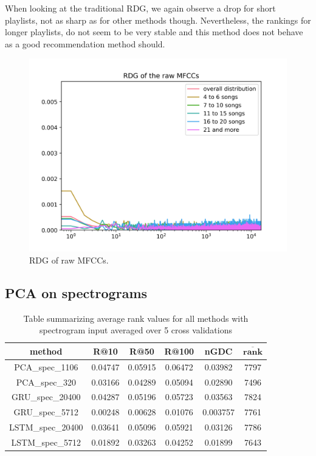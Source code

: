  When looking at the traditional RDG, we again observe a drop for short playlists, not as sharp as for other methods though. Nevertheless, the rankings for longer playlists, do not seem to be very stable and this method does not behave as a good recommendation method should.
 
\begin{figure}[h]
    \centering
	\includegraphics[width=120mm]{./img/mfcc_graph.png}
	\caption{RDG of raw MFCCs.}
	\label{fig:mfcc_graph}
\end{figure}

\subsection{PCA on spectrograms}\label{ssec:pca_spec_results}

\begin{table}[h]
\centering
\renewcommand{\arraystretch}{1.5}
\begin{tabu} to 1\textwidth { | c || c | c | c | c | c |}
 \hline
 \textbf{method} & \textbf{R@10} & \textbf{R@50} & \textbf{R@100} & \textbf{nGDC} & $ \boldsymbol{\overline{rank}} $ \\
 \hline
 \hline
 PCA\_spec\_1106 & 0.04747 & 0.05915 &  0.06472 & 0.03982 & 7797 \\
 \hline
 PCA\_spec\_320 & 0.03166 & 0.04289 &  0.05094 & 0.02890 & 7496 \\
 \hline
 GRU\_spec\_20400 & 0.04287 & 0.05196 & 0.05723 & 0.03563 & 7824 \\
 \hline
 GRU\_spec\_5712 & 0.00248 & 0.00628 & 0.01076 & 0.003757 & 7761 \\
 \hline
 LSTM\_spec\_20400 & 0.03641 & 0.05096 & 0.05921 & 0.03126 & 7786 \\
 \hline
 LSTM\_spec\_5712 & 0.01892 & 0.03263 & 0.04252 &  0.01899 & 7643 \\
 \hline
\end{tabu} \\
\caption{Table summarizing average rank values for all methods with spectrogram input averaged over 5 cross validations}
\label{table:spec_methods}
\end{table}
 
